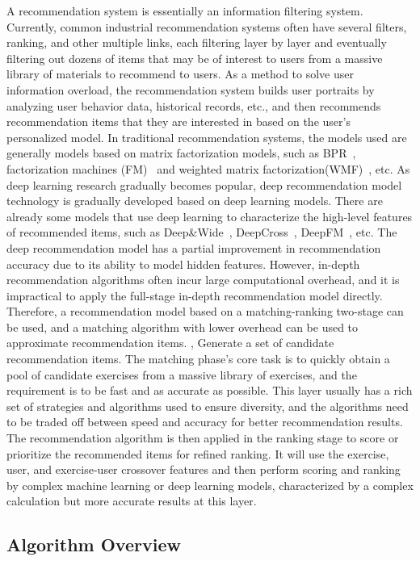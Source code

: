 A recommendation system is essentially an information filtering system. Currently, common industrial recommendation systems often have several filters, ranking, and other multiple links, each filtering layer by layer and eventually filtering out dozens of items that may be of interest to users from a massive library of materials to recommend to users. As a method to solve user information overload, the recommendation system builds user portraits by analyzing user behavior data, historical records, etc., and then recommends recommendation items that they are interested in based on the user's personalized model. In traditional recommendation systems, the models used are generally models based on matrix factorization models, such as BPR~\cite{rendle2012bpr}, factorization machines (FM)~\cite{koren2008factorization} and weighted matrix factorization(WMF)~\cite{hu2008collaborative}, etc. As deep learning research gradually becomes popular, deep recommendation model technology is gradually developed based on deep learning models. There are already some models that use deep learning to characterize the high-level features of recommended items, such as Deep\&Wide~\cite{cheng2016wide}, DeepCross~\cite{shan2016deep}, DeepFM~\cite{guo2017deepfm}, etc. The deep recommendation model has a partial improvement in recommendation accuracy due to its ability to model hidden features. However, in-depth recommendation algorithms often incur large computational overhead, and it is impractical to apply the full-stage in-depth recommendation model directly. Therefore, a recommendation model based on a matching-ranking two-stage can be used, and a matching algorithm with lower overhead can be used to approximate recommendation items. , Generate a set of candidate recommendation items. The matching phase's core task is to quickly obtain a pool of candidate exercises from a massive library of exercises, and the requirement is to be fast and as accurate as possible. This layer usually has a rich set of strategies and algorithms used to ensure diversity, and the algorithms need to be traded off between speed and accuracy for better recommendation results. The recommendation algorithm is then applied in the ranking stage to score or prioritize the recommended items for refined ranking. It will use the exercise, user, and exercise-user crossover features and then perform scoring and ranking by complex machine learning or deep learning models, characterized by a complex calculation but more accurate results at this layer.

\subsection{Algorithm Overview}

